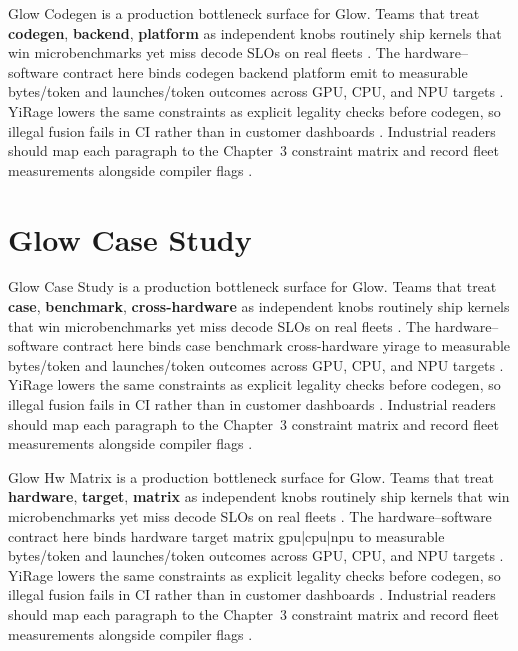 Glow Codegen is a production bottleneck surface for Glow. Teams that treat \textbf{codegen}, \textbf{backend}, \textbf{platform} as independent knobs routinely ship kernels that win microbenchmarks yet miss decode SLOs on real fleets \citep{nvidia2022hopper,amd2024aie}. The hardware--software contract here binds codegen backend platform emit to measurable bytes/token and launches/token outcomes across GPU, CPU, and NPU targets \citep{semianalysis2024tma,dlbook}. YiRage lowers the same constraints as explicit legality checks before codegen, so illegal fusion fails in CI rather than in customer dashboards \citep{amd2024xdna,dao2022flashattention}. Industrial readers should map each paragraph to the Chapter~3 constraint matrix and record fleet measurements alongside compiler flags \citep{amd2024aie,kwon2023vllm}.

\section{Glow Case Study}
\label{sec:glow_case_study}

Glow Case Study is a production bottleneck surface for Glow. Teams that treat \textbf{case}, \textbf{benchmark}, \textbf{cross-hardware} as independent knobs routinely ship kernels that win microbenchmarks yet miss decode SLOs on real fleets \citep{semianalysis2024tma,dlbook}. The hardware--software contract here binds case benchmark cross-hardware yirage to measurable bytes/token and launches/token outcomes across GPU, CPU, and NPU targets \citep{amd2024xdna,dao2022flashattention}. YiRage lowers the same constraints as explicit legality checks before codegen, so illegal fusion fails in CI rather than in customer dashboards \citep{amd2024aie,kwon2023vllm}. Industrial readers should map each paragraph to the Chapter~3 constraint matrix and record fleet measurements alongside compiler flags \citep{dlbook,nvidia2024cudagraphs}.

Glow Hw Matrix is a production bottleneck surface for Glow. Teams that treat \textbf{hardware}, \textbf{target}, \textbf{matrix} as independent knobs routinely ship kernels that win microbenchmarks yet miss decode SLOs on real fleets \citep{memoryfloor2026,amd2024xdna}. The hardware--software contract here binds hardware target matrix gpu|cpu|npu to measurable bytes/token and launches/token outcomes across GPU, CPU, and NPU targets \citep{nvidia2022hopper,amd2024aie}. YiRage lowers the same constraints as explicit legality checks before codegen, so illegal fusion fails in CI rather than in customer dashboards \citep{semianalysis2024tma,dlbook}. Industrial readers should map each paragraph to the Chapter~3 constraint matrix and record fleet measurements alongside compiler flags \citep{amd2024xdna,dao2022flashattention}.

